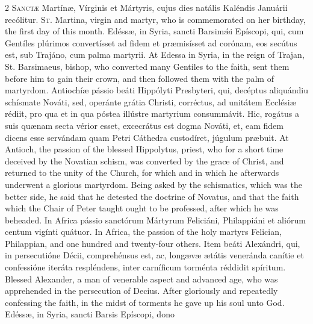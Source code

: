 \begin{paracol}{2}
\lettrine[lines=2]{S}{anctæ} Martínæ, Vírginis et Mártyris, cujus 
 dies natális Kaléndis Januárii recólitur.
\switchcolumn
{}
\lettrine[lines=2]{S}{t.} Martina, virgin and martyr, who is commemorated on her birthday, the 
 first day of this month.
\switchcolumn*
{}
Edéssæ, in Syria, sancti Barsimǽi Epíscopi, 
 qui, cum Gentíles plúrimos convertísset ad fidem et præmisísset ad corónam, 
 eos secútus est, sub Trajáno, cum palma martyrii.
\switchcolumn
{}
At Edessa in Syria, in the reign of Trajan, St. Barsimaeus, bishop, who 
 converted many Gentiles to the faith, sent them before him to gain their 
 crown, and then followed them with the palm of martyrdom.
\switchcolumn*
{}
Antiochíæ pássio beáti Hippólyti Presbyteri, qui, decéptus aliquándiu schísmate
  Nováti, sed, operánte grátia Christi, corréctus, ad unitátem Ecclésiæ rédiit,
  pro qua et in qua póstea illústre martyrium consummávit. Hic, rogátus a suis
  quænam secta vérior esset, excecrátus est dogma Nováti, et, eam fidem dicens
  esse servándam quam Petri Cáthedra custodíret, júgulum præbuit.
\switchcolumn
{}
At Antioch, the passion of the blessed Hippolytus, priest, who for a short 
 time deceived by the Novatian schism, was converted by the grace of Christ, 
 and returned to the unity of the Church, for which and in which he 
 afterwards underwent a glorious martyrdom. Being asked by the 
 schismatics, which was the better side, he said that he detested the 
 doctrine of Novatus, and that the faith which the Chair of Peter taught 
 ought to be professed, after which he was beheaded.
\switchcolumn*
{}
In Africa pássio sanctórum Mártyrum Feliciáni, Philappiáni et aliórum centum 
 vigínti quátuor.
\switchcolumn
{}
In Africa, the passion of the holy martyrs Felician, Philappian, and one 
 hundred and twenty-four others.
\switchcolumn*
{}
Item beáti Alexándri, qui, in persecutióne Décii, comprehénsus est, ac, longævæ 
 ætátis veneránda canítie et confessióne iteráta respléndens, inter 
 carníficum torménta réddidit spíritum.
\switchcolumn
{}
Blessed Alexander, a man of venerable aspect and advanced age, who was 
 apprehended in the persecution of Decius. After gloriously and 
 repeatedly confessing the faith, in the midst of torments he gave up his 
 soul unto God.
\switchcolumn*
{}
Edéssæ, in Syria, sancti Barsis Epíscopi, dono 

\end{paracol}
